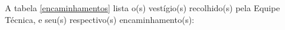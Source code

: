 \documentclass[a4paper,12pt,oneside]{article}
\newcommand{\fig}[3]{       %
	\begin{figure}[H]
		\centering
		\texttt{[image: \#1]}
		\settowidth{\imgwidth}{\texttt{[image: \#1]}}
		\captionsetup{width=\imgwidth}
		\caption{#2}
		\label{#3}
	\end{figure}
}
\newcommand{\f}[2]{\fig{#1.jpg}{#2}{#1}}
\newlength{\imgwidth}                     %
\newcounter{c}
\newcounter{d}
\newcounter{u}
\begin{document}













A tabela \ref{encaminhamentos} lista o(s) vestígio(s) recolhido(s) pela Equipe Técnica, e seu(s) respectivo(s) encaminhamento(s):
\end{document}
